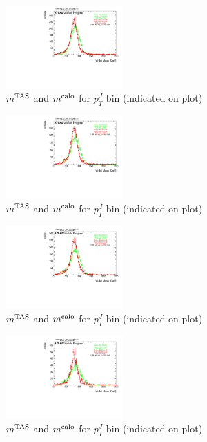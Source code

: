 \begin{figure}
 
\includegraphics[width=0.4\textwidth]{appendixB/mTAS_W_calibmCal_20:07:01-03-11-2016/12cfrt_h_FatJet_ptJ08m.pdf}
\caption{$m^\textrm{TAS}$ and $m^\textrm{calo}$ for $p_{T}^{J}$ bin (indicated on plot) }
 
\end{figure}
 
\begin{figure}
 
\includegraphics[width=0.4\textwidth]{appendixB/mTAS_W_calibmCal_20:07:01-03-11-2016/12cfrt_h_FatJet_ptJ09m.pdf}
\caption{$m^\textrm{TAS}$ and $m^\textrm{calo}$ for $p_{T}^{J}$ bin (indicated on plot) }
 
\end{figure}
 
\begin{figure}
 
\includegraphics[width=0.4\textwidth]{appendixB/mTAS_W_calibmCal_20:07:01-03-11-2016/12cfrt_h_FatJet_ptJ10m.pdf}
\caption{$m^\textrm{TAS}$ and $m^\textrm{calo}$ for $p_{T}^{J}$ bin (indicated on plot) }
 
\end{figure}
 
\begin{figure}
 
\includegraphics[width=0.4\textwidth]{appendixB/mTAS_W_calibmCal_20:07:01-03-11-2016/12cfrt_h_FatJet_ptJ11m.pdf}
\caption{$m^\textrm{TAS}$ and $m^\textrm{calo}$ for $p_{T}^{J}$ bin (indicated on plot) }
 
\end{figure}
 

